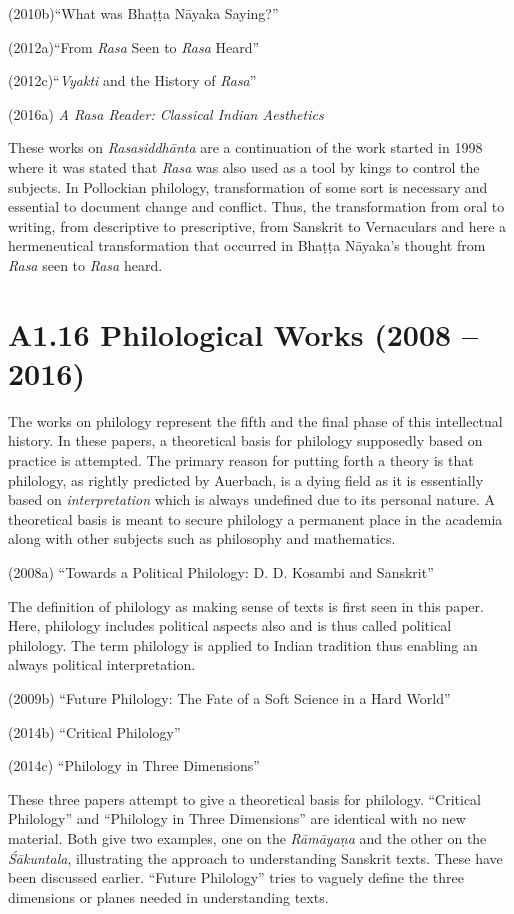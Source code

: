 (2010b)“What was Bhaṭṭa Nāyaka Saying?”

(2012a)“From \textit{Rasa} Seen to \textit{Rasa} Heard”

(2012c)“\textit{Vyakti }and the History of\textit{ Rasa}”

(2016a) \textit{A Rasa Reader: Classical Indian Aesthetics}

These works on \textit{Rasasiddhānta} are a continuation of the work started in 1998 where it was stated that \textit{Rasa} was also used as a tool by kings to control the subjects. In Pollockian philology, transformation of some sort is necessary and essential to document change and conflict. Thus, the transformation from oral to writing, from descriptive to prescriptive, from Sanskrit to Vernaculars and here a hermeneutical transformation that occurred in Bhaṭṭa Nāyaka’s thought from\textit{ Rasa} seen to \textit{Rasa} heard.


\section*{A1.16 Philological Works (2008 – 2016)}

The works on philology represent the fifth and the final phase of this intellectual history. In these papers, a theoretical basis for philology supposedly based on practice is attempted. The primary reason for putting forth a theory is that philology, as rightly predicted by Auerbach, is a dying field as it is essentially based on \textit{interpretation} which is always undefined due to its personal nature. A theoretical basis is meant to secure philology a permanent place in the academia along with other subjects such as philosophy and mathematics.

(2008a) “Towards a Political Philology: D. D. Kosambi and Sanskrit”

The definition of philology as making sense of texts is first seen in this paper. Here, philology includes political aspects also and is thus called political philology. The term philology is applied to Indian tradition thus enabling an always political interpretation.

(2009b) “Future Philology: The Fate of a Soft Science in a Hard World”

(2014b) “Critical Philology”

(2014c) “Philology in Three Dimensions”

These three papers attempt to give a theoretical basis for philology. “Critical Philology” and “Philology in Three Dimensions” are identical with no new material. Both give two examples, one on the \textit{Rāmāyaṇa} and the other on the \textit{Śākuntala}, illustrating the approach to understanding Sanskrit texts. These have been discussed earlier. “Future Philology” tries to vaguely define the three dimensions or planes needed in understanding texts.

